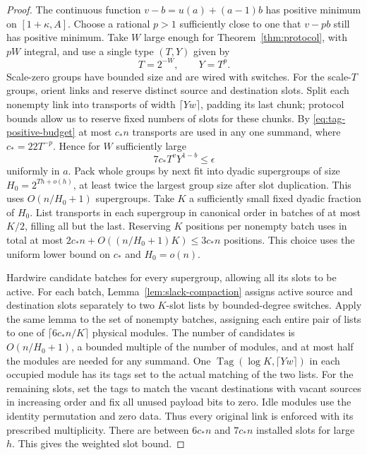 \begin{proof}
The continuous function $v-b=u(a)+(a-1)b$ has positive minimum
on $[1+\kappa,A]$. Choose a rational $p>1$ sufficiently close to one
that $v-pb$ still has positive minimum. Take $W$ large enough for
Theorem~\ref{thm:protocol}, with $pW$ integral, and use a single type
$(T,Y)$ given by
\[
 T=2^{-W},\qquad Y=T^p.
\]
Scale-zero groups have bounded size and are wired with switches. For the scale-$T$ groups, orient links and reserve distinct source and destination slots. Split each nonempty link into transports of width $\lceil Y w\rceil$, padding its last chunk; protocol bounds allow us to reserve fixed numbers of slots for these chunks. By \eqref{eq:tag-positive-budget} at most $c_*n$ transports are used in any one summand, where $c_*=22 T^{-p}$. Hence for $W$ sufficiently large
\[
 7c_* T^v Y^{1-b}\le\epsilon
\]
uniformly in $a$.
Pack whole groups by next fit into dyadic supergroups of
size $H_0=2^{Th+o(h)}$, at least twice the largest group size after slot
duplication. This uses $O(n/H_0+1)$ supergroups. Take $K$ a sufficiently
small fixed dyadic fraction of $H_0$. List transports in each supergroup
in canonical order in batches of at most $K/2$, filling all but the last.
Reserving $K$ positions per nonempty batch uses in total at most
$2c_*n+O((n/H_0+1)K)\le3c_*n$ positions. This choice uses the uniform
lower bound on $c_*$ and $H_0=o(n)$.

Hardwire candidate batches for every supergroup, allowing all its slots
to be active. For each batch, Lemma~\ref{lem:slack-compaction} assigns active source and destination slots separately to two $K$-slot
lists by bounded-degree switches. Apply the same lemma to the set of
nonempty batches, assigning each entire pair of lists to one of
$\lceil6c_*n/K\rceil$ physical modules. The number of candidates is
$O(n/H_0+1)$, a bounded multiple of the number of modules, and at most
half the modules are needed for any summand. One
$\operatorname{Tag}(\log K,\lceil Yw\rceil)$ in each occupied module
has its tags set to the actual matching of the two lists. For the remaining
slots, set the tags to match the vacant destinations with vacant sources
in increasing order and fix all unused payload bits to zero. Idle modules
use the identity permutation and zero data. Thus every original link is
enforced with its prescribed multiplicity. There are between $6c_*n$
and $7c_*n$ installed slots for large $h$. This gives the weighted slot bound.


\end{proof}
